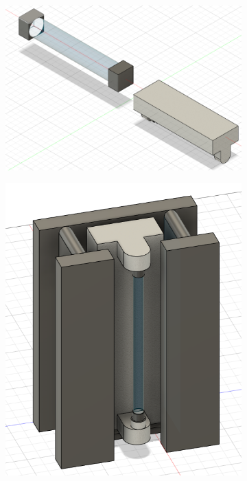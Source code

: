 \documentclass[letterpaper]{article} %
\begin{document}
\begin{figure}[htpb]
\begin{subfigure}[b]{.5\textwidth}
  \end{subfigure}
  \begin{subfigure}[b]{.5\textwidth}
    \centering
    \includegraphics[scale=0.1]{../figs/img/v2UVLamp}
  \end{subfigure}
  \begin{subfigure}[b]{.5\textwidth}
    \centering
    \includegraphics[scale=0.1]{../figs/img/v2UVLampConveyor}

\end{subfigure}
\end{figure}
\end{document}
